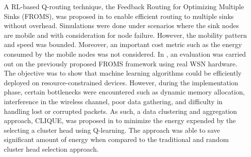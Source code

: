 \documentclass[journal]{IEEEtran}
\begin{document}
A RL-based Q-routing technique, the Feedback Routing for Optimizing Multiple Sinks (FROMS), was proposed in \cite{Forster2007, Forster2007FROMS} to enable efficient routing to multiple sinks without overhead. Simulations were done under scenarios where the sink nodes are mobile and with consideration for node failure. However, the mobility pattern and speed was bounded. Moreover, an important cost metric such as the energy consumed by the mobile nodes was not considered. In \cite{Forster2008}, an evaluation was carried out on the previously proposed FROMS framework using real WSN hardware. The objective was to show that machine learning algorithms could be efficiently deployed on resource-constrained devices. However, during the implementation phase, certain bottlenecks were encountered such as dynamic memory allocation, interference in the wireless channel, poor data gathering, and difficulty in handling lost or corrupted packets. As such, a data clustering and aggregation approach, CLIQUE, was proposed in \cite{Forster2009} to minimize the energy expended by the selecting a cluster head using Q-learning. The approach was able to save significant amount of energy when compared to the traditional and random cluster head selection approach.
\end{document}
